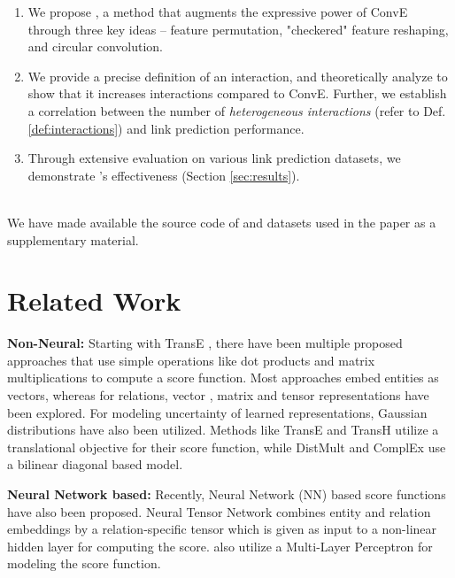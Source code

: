 \documentclass[11pt,a4paper]{article}
\begin{document}
\begin{enumerate}[itemsep=2pt,parsep=0pt,partopsep=0pt,leftmargin=*,topsep=0.2pt]
	\item We propose \method{}, a method that augments the expressive power of ConvE through three key ideas -- feature permutation, "checkered" feature reshaping, and circular convolution.
	\item We provide a precise definition of an interaction, and theoretically analyze \method{} to show that it increases interactions compared to ConvE. Further, we establish a correlation between the number of \textit{heterogeneous interactions} (refer to Def. \ref{def:interactions}) and link prediction performance.
	\item Through extensive evaluation on various link prediction datasets, we demonstrate \method{}'s effectiveness (Section \ref{sec:results}).
\end{enumerate}
\\
We have made available the source code of \method{} and datasets used in the paper as a supplementary material.


 \section{Related Work}
\label{sec:related_work}



\noindent \textbf{Non-Neural:} Starting with TransE \cite{transe}, there have been multiple proposed approaches that use simple operations like dot products and matrix multiplications to compute a score function. Most approaches embed entities as vectors, whereas for relations, vector \cite{transe,hole}, matrix \cite{distmult,analogy} and tensor \cite{rel_as_tensor} representations have been explored. For modeling uncertainty of learned representations, Gaussian distributions \cite{gaussian_kg,transg} have also been utilized.
Methods like TransE \cite{transe} and TransH \cite{transh} utilize a translational objective for their score function, while DistMult \cite{distmult} and ComplEx \cite{complex} use a bilinear diagonal based model.

\noindent \textbf{Neural Network based:} Recently, Neural Network (NN) based score functions have also been proposed. Neural Tensor Network \cite{neural_tensor_network} combines entity and relation embeddings by a relation-specific tensor which is given as input to a non-linear hidden layer for computing the score. \citet{kg_incomp1,chandrahas2017} also utilize a Multi-Layer Perceptron for modeling the score function. 
\end{document}
